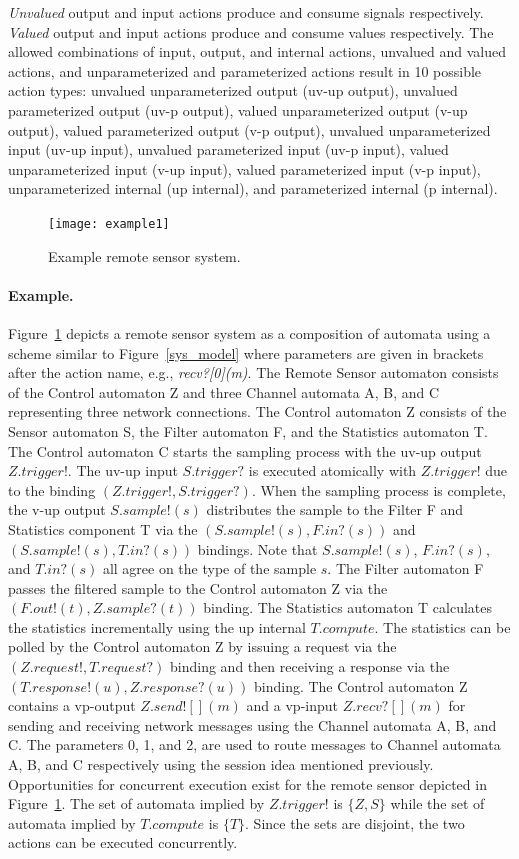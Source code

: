 \emph{Unvalued} output and input actions produce and consume signals respectively.
\emph{Valued} output and input actions produce and consume values respectively.
The allowed combinations of input, output, and internal actions, unvalued and valued actions, and unparameterized and parameterized actions result in 10 possible action types:
unvalued unparameterized output (uv-up output),
unvalued parameterized output (uv-p output),
valued unparameterized output (v-up output),
valued parameterized output (v-p output),
unvalued unparameterized input (uv-up input),
unvalued parameterized input (uv-p input),
valued unparameterized input (v-up input),
valued parameterized input (v-p input),
unparameterized internal (up internal), and
parameterized internal (p internal).

\begin{figure}
\center
\texttt{[image: example1]}
\caption{Example remote sensor system.}
\label{example1}
\end{figure}

\paragraph*{Example.}
Figure~\ref{example1} depicts a remote sensor system as a composition of automata using a scheme similar to Figure~\ref{sys_model} where parameters are given in brackets after the action name, e.g., \emph{recv?[0](m)}.
The Remote Sensor automaton consists of the Control automaton Z and three Channel automata A, B, and C representing three network connections.
The Control automaton Z consists of the Sensor automaton S, the Filter automaton F, and the Statistics automaton T.
The Control automaton C starts the sampling process with the uv-up output $Z.trigger!$.
The uv-up input $S.trigger?$ is executed atomically with $Z.trigger!$ due to the binding $(Z.trigger!, S.trigger?)$.
When the sampling process is complete, the v-up output $S.sample!(s)$ distributes the sample to the Filter F and Statistics component T via the $(S.sample!(s), F.in?(s))$ and $(S.sample!(s), T.in?(s))$ bindings.
Note that $S.sample!(s)$, $F.in?(s)$, and $T.in?(s)$ all agree on the type of the sample $s$.
The Filter automaton F passes the filtered sample to the Control automaton Z via the $(F.out!(t), Z.sample?(t))$ binding.
The Statistics automaton T calculates the statistics incrementally using the up internal $T.compute$.
The statistics can be polled by the Control automaton Z by issuing a request via the $(Z.request!, T.request?)$ binding and then receiving a response via the $(T.response!(u), Z.response?(u))$ binding.
The Control automaton Z contains a vp-output $Z.send![](m)$ and a vp-input $Z.recv?[](m)$ for sending and receiving network messages using the Channel automata A, B, and C.
The parameters 0, 1, and 2, are used to route messages to Channel automata A, B, and C respectively using the session idea mentioned previously.
Opportunities for concurrent execution exist for the remote sensor depicted in Figure~\ref{example1}.
The set of automata implied by $Z.trigger!$ is $\{Z, S\}$ while the set of automata implied by $T.compute$ is $\{T\}$.
Since the sets are disjoint, the two actions can be executed concurrently.
\fi

